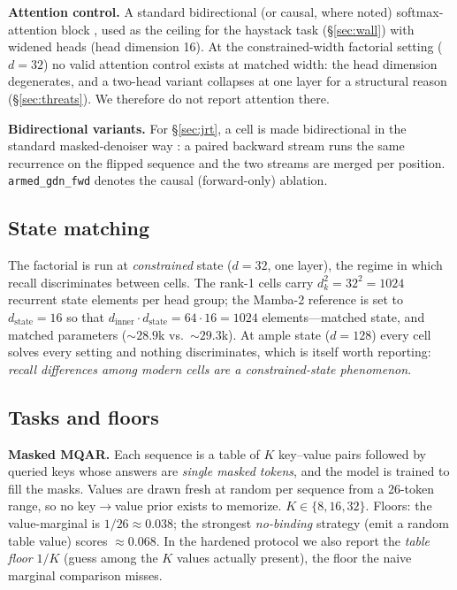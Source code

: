 \documentclass{article}
\newcommand{\dstate}{d_{\mathrm{state}}}
\newcommand{\dkey}{d_k}
\begin{document}
\textbf{Attention control.} A standard bidirectional (or causal, where noted) softmax-attention block \citep{vaswani2017attention}, used as the ceiling for the haystack task (\S\ref{sec:wall}) with widened heads (head dimension 16). At the constrained-width factorial setting ($d{=}32$) no valid attention control exists at matched width: the head dimension degenerates, and a two-head variant collapses at one layer for a structural reason (\S\ref{sec:threats}). We therefore do not report attention there.

\textbf{Bidirectional variants.} For \S\ref{sec:jrt}, a cell is made bidirectional in the standard masked-denoiser way \citep{singh2025diffumamba}: a paired backward stream runs the same recurrence on the flipped sequence and the two streams are merged per position. \texttt{armed\_gdn\_fwd} denotes the causal (forward-only) ablation.

\subsection{State matching}\label{sec:statematch}

The factorial is run at \emph{constrained} state ($d{=}32$, one layer), the regime in which recall discriminates between cells. The rank-1 cells carry $\dkey^2 = 32^2 = 1024$ recurrent state elements per head group; the Mamba-2 reference is set to $\dstate{=}16$ so that $d_{\mathrm{inner}}\cdot\dstate = 64\cdot 16 = 1024$ elements---matched state, and matched parameters (${\sim}28.9$k vs.\ ${\sim}29.3$k). At ample state ($d{=}128$) every cell solves every setting and nothing discriminates, which is itself worth reporting: \emph{recall differences among modern cells are a constrained-state phenomenon}.

\subsection{Tasks and floors}\label{sec:tasks}

\textbf{Masked MQAR.} Each sequence is a table of $K$ key--value pairs followed by queried keys whose answers are \emph{single masked tokens}, and the model is trained to fill the masks. Values are drawn fresh at random per sequence from a 26-token range, so no key$\to$value prior exists to memorize. $K\in\{8,16,32\}$. Floors: the value-marginal is $1/26\approx 0.038$; the strongest \emph{no-binding} strategy (emit a random table value) scores ${\approx}0.068$. In the hardened protocol we also report the \emph{table floor} $1/K$ (guess among the $K$ values actually present), the floor the naive marginal comparison misses.
\end{document}
